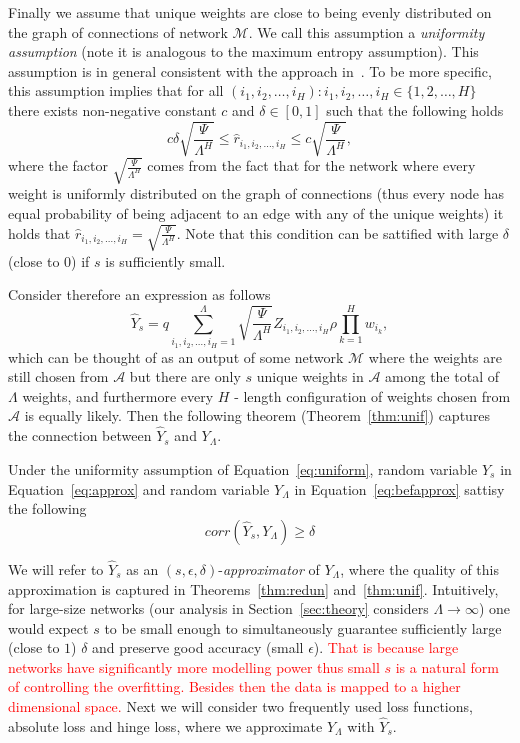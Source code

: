 \documentclass[twoside]{article}
\begin{document}
Finally we assume that unique weights are close to being evenly distributed on the graph of connections of network $\mathcal{M}$. We call this assumption a \textit{uniformity assumption} (note it is analogous to the maximum entropy assumption). This assumption is in general consistent with the approach in~\cite{NIPS2013_5025}. To be more specific, this assumption implies that for all $(i_1,i_2,\dots,i_H):i_1,i_2,\dots,i_H \in \{1,2,\dots,H\}$ there exists non-negative constant $c$ and $\delta \in [0,1]$ such that the following holds
\begin{equation}
c\delta\sqrt{\frac{\Psi}{\Lambda^H}} \leq \hat{r}_{i_1,i_2,\dots,i_H} \leq c\sqrt{\frac{\Psi}{\Lambda^H}},
\label{eq:uniform}
\end{equation}
where the factor $\sqrt{\frac{\Psi}{\Lambda^H}}$ comes from the fact that for the network where every weight is uniformly distributed on the graph of connections (thus every node has equal probability of being adjacent to an edge with any of the unique weights) it holds that $\hat{r}_{i_1,i_2,\dots,i_H} = \sqrt{\frac{\Psi}{\Lambda^H}}$. Note that this condition can be sattified with large $\delta$ (close to $0$) if $s$ is sufficiently small.

Consider therefore an expression as follows
\begin{equation}
\hat{Y}_s = q\sum_{i_1,i_2,\dots,i_H=1}^{\Lambda}\sqrt{\frac{\Psi}{\Lambda^H}}Z_{i_1,i_2,\dots,i_H}\rho\prod_{k = 1}^{H}w_{i_k},
\label{eq:approx}
\end{equation}
which can be thought of as an output of some network $\mathcal{M}$ where the weights are still chosen from $\mathcal{A}$ but there are only $s$ unique weights in $\mathcal{A}$ among the total of $\Lambda$ weights, and furthermore every $H$ - length configuration of weights chosen from $\mathcal{A}$ is equally likely. Then the following theorem (Theorem~\ref{thm:unif}) captures the connection between $\hat{Y}_s$ and $Y_{\Lambda}$.

\begin{theorem}
Under the uniformity assumption of Equation~\ref{eq:uniform}, random variable $\hat{Y}_s$ in Equation~\ref{eq:approx} and random variable $Y_{\Lambda}$ in Equation~\ref{eq:befapprox} sattisy the following
\[corr(\hat{Y}_s,Y_{\Lambda}) \geq \delta
\]
\label{thm:unif}
\end{theorem}

We will refer to $\hat{Y}_s$ as an $(s,\epsilon,\delta)$-\textit{approximator} of $Y_{\Lambda}$, where the quality of this approximation is captured in Theorems~\ref{thm:redun} and~\ref{thm:unif}. Intuitively, for large-size networks (our analysis in Section~\ref{sec:theory} considers $\Lambda \rightarrow \infty$) one would expect $s$ to be small enough to simultaneously guarantee sufficiently large (close to $1$) $\delta$ and preserve good accuracy (small $\epsilon$). \textcolor{red}{That is because large networks have significantly more modelling power thus small $s$ is a natural form of controlling the overfitting. Besides then the data is mapped to a higher dimensional space.} Next we will consider two frequently used loss functions, absolute loss and hinge loss, where we approximate $Y_{\Lambda}$ with $\hat{Y}_s$. 
\end{document}

